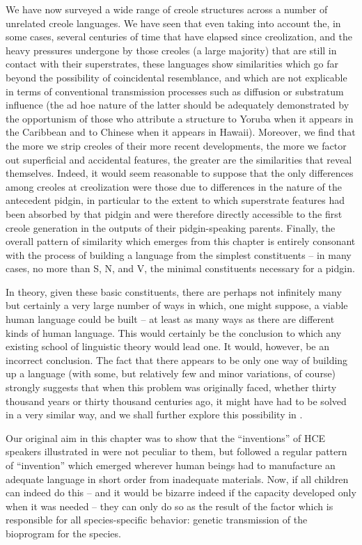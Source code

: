We have now surveyed a wide range of creole structures across a number of unrelated creole languages. We have seen that even taking into account the, in some cases, several centuries of time that have elapsed since creolization, and the heavy pressures undergone by those creoles (a large majority) that are still in contact with their superstrates, these languages show similarities which go far beyond the possibility of coincidental resemblance, and which are not explicable in terms of conventional transmission processes such as diffusion or substratum influence (the ad hoe nature of the latter should be adequately demonstrated by the opportunism of those who attribute a structure to Yoruba when it appears in the Caribbean and to Chinese when it appears in Hawaii). Moreover, we find that the more we strip creoles of their more recent developments, the more we factor out superficial and accidental features, the greater are the similarities that reveal themselves. Indeed, it would seem reasonable to suppose that the only differences among creoles at creolization were those due to differences in the nature of the antecedent pidgin, in particular to the extent to which superstrate features had been absorbed by that pidgin and were therefore directly accessible to the first creole generation in the outputs of their pidgin-speaking parents. Finally, the overall pattern of similarity which emerges from this chapter is entirely consonant with the process of building a language from the simplest constituents -- in many cases, no more than S, N, and V, the minimal constituents necessary for a pidgin. 


In theory, given these basic constituents, there are perhaps not infinitely many but certainly a very large number of ways in which, one might suppose, a viable human language could be built -- at least as many ways as there are different kinds of human language. This would certainly be the conclusion to which any existing school of linguistic theory would lead one. It would, however, be an incorrect conclusion. The fact that there appears to be only one way of building up a language (with some, but relatively few and minor variations, of course) strongly suggests that when this problem was originally faced, whether thirty thousand years or thirty thousand centuries ago, it might have had to be solved in a very similar way, and we shall further explore this possibility in .

Our original aim in this chapter was to show that the ``inventions'' of HCE speakers illustrated in  were not peculiar to them, but followed a regular pattern of ``invention'' which emerged wherever human beings had to manufacture an adequate language in short order from inadequate materials. Now, if all children can indeed do this -- and it would be bizarre indeed if the capacity developed only when it was needed -- they can only do so as the result of the factor which is responsible for all species-specific behavior: genetic transmission of the bioprogram for the species.

